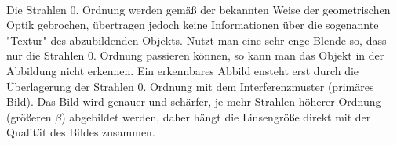 \documentclass[a4paper,10pt]{scrartcl}
\begin{document}
			\\
			Die Strahlen 0. Ordnung werden gemäß der bekannten Weise der geometrischen Optik gebrochen, übertragen jedoch keine Informationen über die sogenannte "Textur" des abzubildenden Objekts. Nutzt man eine sehr enge Blende so, dass nur die Strahlen 0. Ordnung passieren können, so kann man das Objekt in der Abbildung nicht erkennen. Ein erkennbares Abbild ensteht erst durch die Überlagerung der Strahlen 0. Ordnung mit dem Interferenzmuster (primäres Bild). Das Bild wird genauer und schärfer, je mehr Strahlen höherer Ordnung 
			(größeren \(\beta\)) abgebildet werden, daher hängt die Linsengröße direkt mit der Qualität des Bildes zusammen.
			
			
\end{document}
